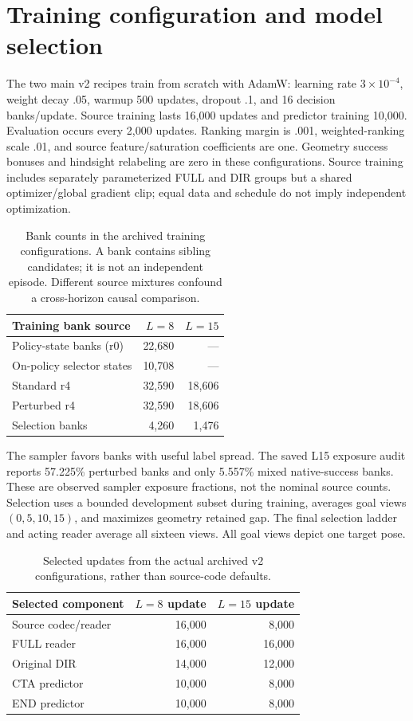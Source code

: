 \documentclass[10pt,twocolumn,letterpaper]{article}
\begin{document}
\section{Training configuration and model selection}
The two main v2 recipes train from scratch with AdamW: learning rate $3\times10^{-4}$, weight decay .05, warmup 500 updates, dropout .1, and 16 decision banks/update. Source training lasts 16,000 updates and predictor training 10,000. Evaluation occurs every 2,000 updates. Ranking margin is .001, weighted-ranking scale .01, and source feature/saturation coefficients are one. Geometry success bonuses and hindsight relabeling are zero in these configurations. Source training includes separately parameterized FULL and DIR groups but a shared optimizer/global gradient clip; equal data and schedule do not imply independent optimization.

\begin{table}[t]
\centering\small
\begin{tabular}{lrr}
\toprule
Training bank source & $L=8$ & $L=15$ \\
\midrule
Policy-state banks (r0) & 22,680 & --- \\
On-policy selector states & 10,708 & --- \\
Standard r4 & 32,590 & 18,606 \\
Perturbed r4 & 32,590 & 18,606 \\
\midrule
Selection banks & 4,260 & 1,476 \\
\bottomrule
\end{tabular}
\caption{Bank counts in the archived training configurations. A bank contains sibling candidates; it is not an independent episode. Different source mixtures confound a cross-horizon causal comparison.}
\end{table}

The sampler favors banks with useful label spread. The saved L15 exposure audit reports 57.225\% perturbed banks and only 5.557\% mixed native-success banks. These are observed sampler exposure fractions, not the nominal source counts. Selection uses a bounded development subset during training, averages goal views $(0,5,10,15)$, and maximizes geometry retained gap. The final selection ladder and acting reader average all sixteen views. All goal views depict one target pose.

\begin{table}[t]
\centering\small
\begin{tabular}{lrr}
\toprule
Selected component & $L=8$ update & $L=15$ update \\
\midrule
Source codec/reader & 16,000 & 8,000 \\
FULL reader & 16,000 & 16,000 \\
Original DIR & 14,000 & 12,000 \\
CTA predictor & 10,000 & 8,000 \\
END predictor & 10,000 & 8,000 \\
\bottomrule
\end{tabular}
\caption{Selected updates from the actual archived v2 configurations, rather than source-code defaults.}
\end{table}
\end{document}
